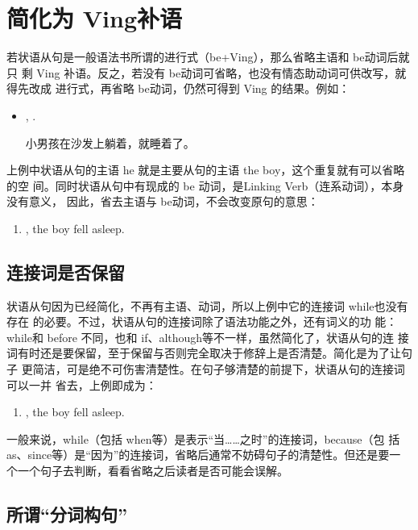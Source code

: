 \section{简化为 Ving补语}

若状语从句是一般语法书所谓的进行式（be+Ving），那么省略主语和 be动词后就只
剩 Ving 补语。反之，若没有 be动词可省略，也没有情态助动词可供改写，就得先改成
进行式，再省略 be动词，仍然可得到 Ving 的结果。例如：

\begin{itemize}
\item {},   .

  小男孩在沙发上躺着，就睡着了。
\end{itemize}
上例中状语从句的主语 he 就是主要从句的主语 the boy，这个重复就有可以省略的空
间。同时状语从句中有现成的 be 动词，是Linking Verb（连系动词），本身没有意义，
因此，省去主语与 be动词，不会改变原句的意思：
\begin{enumerate}
\item {}, the boy fell asleep.
\end{enumerate}

\subsection{连接词是否保留}

状语从句因为已经简化，不再有主语、动词，所以上例中它的连接词 while也没有存在
的必要。不过，状语从句的连接词除了语法功能之外，还有词义的功
能：while和 before 不同，也和 if、although等不一样，虽然简化了，状语从句的连
接词有时还是要保留，至于保留与否则完全取决于修辞上是否清楚。简化是为了让句子
更简洁，可是绝不可伤害清楚性。在句子够清楚的前提下，状语从句的连接词可以一并
省去，上例即成为：
\begin{enumerate}[resume]
\item {}, the boy fell asleep.
\end{enumerate}

一般来说，while（包括 when等）是表示“当……之时”的连接词，because（包
括 as、since等）是“因为”的连接词，省略后通常不妨碍句子的清楚性。但还是要一
个一个句子去判断，看看省略之后读者是否可能会误解。

\subsection{所谓“分词构句”}

